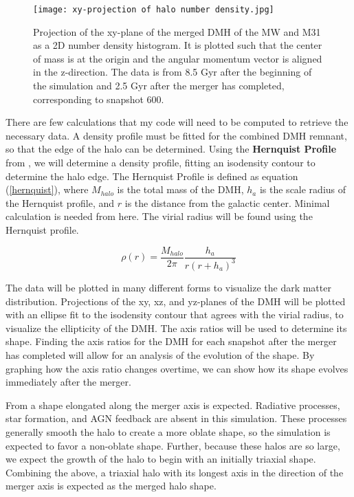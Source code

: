 \documentclass[fleqn,usenatbib]{mnras}
\begin{document}
\begin{figure}
	\texttt{[image: xy-projection of halo number density.jpg]}
    \caption{Projection of the xy-plane of the merged DMH of the MW and M31 as a 2D number density histogram. It is plotted such that the center of mass is at the origin and the angular momentum vector is aligned in the z-direction. The data is from 8.5 Gyr after the beginning of the simulation and 2.5 Gyr after the merger has completed, corresponding to snapshot 600.}                     
    \label{fig:xy-plane projection}
\end{figure}

There are few calculations that my code will need to be computed to retrieve the necessary data. A density profile must be fitted for the combined DMH remnant, so that the edge of the halo can be determined. Using the \textbf{Hernquist Profile} from \citet{Hernquist_1990}, we will determine a density profile, fitting an isodensity contour to determine the halo edge. The Hernquist Profile is defined as equation (\ref{hernquist}), where \begin{math}M_{halo}\end{math} is the total mass of the DMH, \begin{math}h_a\end{math} is the scale radius of the Hernquist profile, and \begin{math}r\end{math} is the distance from the galactic center. Minimal calculation is needed from here. The virial radius will be found using the Hernquist profile.

\begin{equation} \label{hernquist}
    \rho(r)=\frac{M_{halo}}{2\pi} \frac{h_a}{r(r+h_a)^3}
\end{equation}


The data will be plotted in many different forms to visualize the dark matter distribution. Projections of the xy, xz, and yz-planes of the DMH will be plotted with an ellipse fit to the isodensity contour that agrees with the virial radius, to visualize the ellipticity of the DMH. The axis ratios will be used to determine its shape. Finding the axis ratios for the DMH for each snapshot after the merger has completed will allow for an analysis of the evolution of the shape. By graphing how the axis ratio changes overtime, we can show how its shape evolves immediately after the merger.

From \citet{Despali_2016} a shape elongated along the merger axis is expected. Radiative processes, star formation, and AGN feedback are absent in this simulation. These processes generally smooth the halo to create a more oblate shape, so the simulation is expected to favor a non-oblate shape. Further, because these halos are so large, we expect the growth of the halo to begin with an initially triaxial shape. Combining the above, a triaxial halo with its longest axis in the direction of the merger axis is expected as the merged halo shape.
\end{document}
